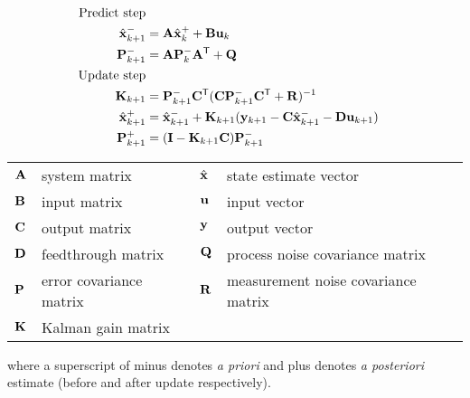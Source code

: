 \begin{theorem}
  \label{thm:kalman_filter}
  \begin{align}
    \text{Predict step} \nonumber \\
    \hat{\mathbf{x}}_{k+1}^- &= \mathbf{A}\hat{\mathbf{x}}_k^+ + \mathbf{B} \mathbf{u}_k \\
    \mathbf{P}_{k+1}^- &= \mathbf{A} \mathbf{P}_k^- \mathbf{A}^\mathsf{T} + \mathbf{Q} \\
    \text{Update step} \nonumber \\
    \mathbf{K}_{k+1} &=
      \mathbf{P}_{k+1}^- \mathbf{C}^\mathsf{T} (\mathbf{C}\mathbf{P}_{k+1}^- \mathbf{C}^\mathsf{T} +
      \mathbf{R})^{-1} \\
    \hat{\mathbf{x}}_{k+1}^+ &=
      \hat{\mathbf{x}}_{k+1}^- + \mathbf{K}_{k+1}(\mathbf{y}_{k+1} -
      \mathbf{C} \hat{\mathbf{x}}_{k+1}^- - \mathbf{D}\mathbf{u}_{k+1}) \\
    \mathbf{P}_{k+1}^+ &= (\mathbf{I} - \mathbf{K}_{k+1}\mathbf{C})\mathbf{P}_{k+1}^-
  \end{align}
  \begin{figurekey}
    \begin{tabular}{llll}
      $\mathbf{A}$ & system matrix & $\hat{\mathbf{x}}$ & state estimate vector \\
      $\mathbf{B}$ & input matrix       & $\mathbf{u}$ & input vector \\
      $\mathbf{C}$ & output matrix      & $\mathbf{y}$ & output vector \\
      $\mathbf{D}$ & feedthrough matrix & $\mathbf{Q}$ & process noise covariance matrix \\
      $\mathbf{P}$ & error covariance matrix & $\mathbf{R}$ & measurement noise covariance matrix \\
      $\mathbf{K}$ & Kalman gain matrix & &
    \end{tabular}
  \end{figurekey}

  where a superscript of minus denotes \textit{a priori} and plus denotes
  \textit{a posteriori} estimate (before and after update respectively).
\end{theorem}

